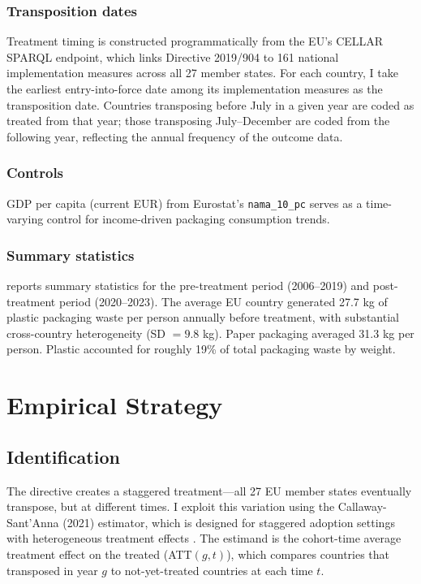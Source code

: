 \documentclass[12pt]{article}
\begin{document}
\subsubsection*{Transposition dates} Treatment timing is constructed programmatically from the EU's CELLAR SPARQL endpoint, which links Directive 2019/904 to 161 national implementation measures across all 27 member states. For each country, I take the earliest entry-into-force date among its implementation measures as the transposition date. Countries transposing before July in a given year are coded as treated from that year; those transposing July--December are coded from the following year, reflecting the annual frequency of the outcome data.

\subsubsection*{Controls} GDP per capita (current EUR) from Eurostat's \texttt{nama\_10\_pc} serves as a time-varying control for income-driven packaging consumption trends.

\subsubsection*{Summary statistics}  reports summary statistics for the pre-treatment period (2006--2019) and post-treatment period (2020--2023). The average EU country generated 27.7 kg of plastic packaging waste per person annually before treatment, with substantial cross-country heterogeneity (SD $= 9.8$ kg). Paper packaging averaged 31.3 kg per person. Plastic accounted for roughly 19\% of total packaging waste by weight.






\section{Empirical Strategy}
\label{sec:strategy}

\subsection{Identification}

The directive creates a staggered treatment---all 27 EU member states eventually transpose, but at different times. I exploit this variation using the Callaway-Sant'Anna (2021) estimator, which is designed for staggered adoption settings with heterogeneous treatment effects \citep{callaway2021difference}. The estimand is the cohort-time average treatment effect on the treated (ATT$(g,t)$), which compares countries that transposed in year $g$ to not-yet-treated countries at each time $t$.
\end{document}
